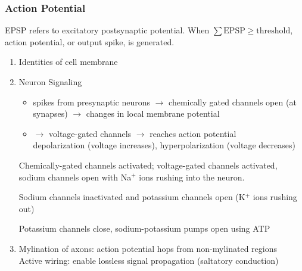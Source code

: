 \documentclass[11pt]{article}
\begin{document}
\subsubsection{Action Potential}
EPSP refers to excitatory postsynaptic potential. When $\sum \text{EPSP}\geq \text{threshold}$, action potential, or output spike, is generated.

\begin{enumerate}
    \item Identities of cell membrane
    \item Neuron Signaling 
    \begin{itemize}
        \item spikes from presynaptic neurons $\rightarrow$ chemically gated channels open (at synapses) $\rightarrow$ changes in local membrane potential
        \item $\rightarrow$ voltage-gated channels $\rightarrow$ reaches action potential\\
        depolarization (voltage increases), hyperpolarization (voltage decreases)
    \end{itemize}

        \begin{center}
    \end{center}
     Chemically-gated channels activated; voltage-gated channels activated, sodium channels open with Na$^+$ ions rushing into the neuron.\par
     Sodium channels inactivated and potassium channels open (K$^+$ ions rushing out)\par
     Potassium channels close, sodium-potassium pumps open using ATP
    \item Mylination of axons: action potential hops from non-mylinated regions\\
    Active wiring: enable lossless signal propagation (saltatory conduction)
\end{enumerate}
\end{document}
